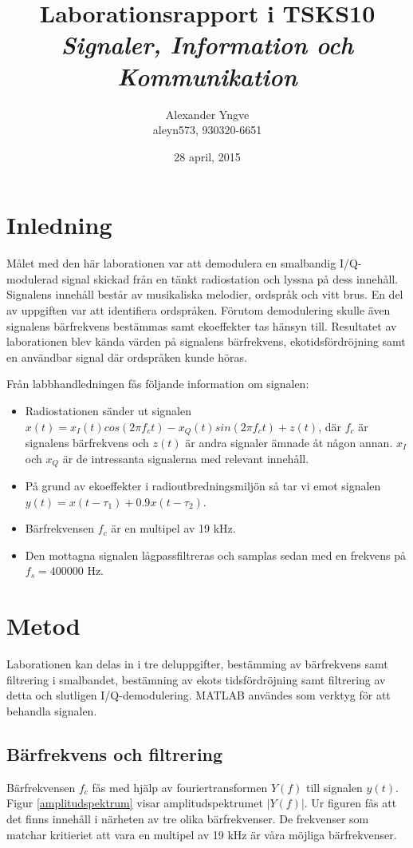 \documentclass[10pt]{article}
\title{Laborationsrapport i TSKS10 \emph{Signaler, Information och Kommunikation}}
\author{Alexander Yngve\\aleyn573, 930320-6651}
\date{28 april, 2015}
\begin{document}
\maketitle

\clearpage

\begin{multicols}{2}
\section{Inledning} \label{inledning}

Målet med den här laborationen var att demodulera en smalbandig I/Q-modulerad signal skickad från en tänkt radiostation och lyssna på dess innehåll. Signalens innehåll består av musikaliska melodier, ordspråk och vitt brus. En del av uppgiften var att identifiera ordspråken. Förutom demodulering skulle även signalens bärfrekvens bestämmas samt ekoeffekter tas hänsyn till. Resultatet av laborationen blev kända värden på signalens bärfrekvens, ekotidsfördröjning samt en användbar signal där ordspråken kunde höras.

Från labbhandledningen fås följande information om signalen:

\begin{itemize}
\item Radiostationen sänder ut signalen $x(t) = x_I(t)cos(2\pi f_ct) - x_Q(t)sin(2\pi f_ct) + z(t)$, där $f_c$ är signalens bärfrekvens och $z(t)$ är andra signaler ämnade åt någon annan. $x_I$ och $x_Q$ är de intressanta signalerna med relevant innehåll.
\item På grund av ekoeffekter i radioutbredningsmiljön så tar vi emot signalen $y(t) = x(t - \tau_1) + 0.9x(t - \tau_2)$. 
\item Bärfrekvensen $f_c$ är en multipel av 19 kHz.
\item Den mottagna signalen lågpassfiltreras och samplas sedan med en frekvens på $f_s = 400000$ Hz.
\end{itemize}

\section{Metod}

Laborationen kan delas in i tre deluppgifter, bestämming av bärfrekvens samt filtrering i smalbandet, bestämning av ekots tidsfördröjning samt filtrering av detta och slutligen I/Q-demodulering. MATLAB användes som verktyg för att behandla signalen.

\subsection{Bärfrekvens och filtrering} \label{filtrering}
Bärfrekvensen $f_c$ fås med hjälp av fouriertransformen $Y(f)$ till signalen $y(t)$. Figur \ref{amplitudspektrum} visar amplitudspektrumet $|Y(f)|$. Ur figuren fås att det finns innehåll i närheten av tre olika bärfrekvenser. De frekvenser som matchar kritieriet att vara en multipel av 19 kHz är våra möjliga bärfrekvenser.


\end{multicols}
\end{document}
